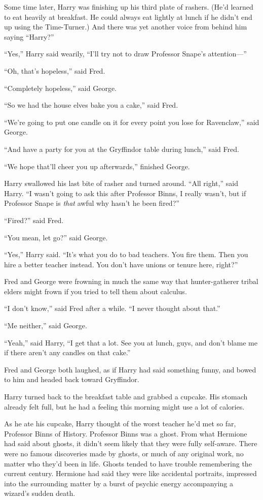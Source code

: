 Some time later, Harry was finishing up his third plate of rashers. (He’d learned to eat heavily at breakfast. He could always eat lightly at lunch if he didn’t end up using the Time-Turner.) And there was yet another voice from behind him saying “Harry?”

“Yes,” Harry said wearily, “I’ll try not to draw Professor Snape’s attention—”

“Oh, that’s hopeless,” said Fred.

“Completely hopeless,” said George.

“So we had the house elves bake you a cake,” said Fred.

“We’re going to put one candle on it for every point you lose for Ravenclaw,” said George.

“And have a party for you at the Gryffindor table during lunch,” said Fred.

“We hope that’ll cheer you up afterwards,” finished George.

Harry swallowed his last bite of rasher and turned around. “All right,” said Harry. “I wasn’t going to ask this after Professor Binns, I really wasn’t, but if Professor Snape is \emph{that} awful why hasn’t he been fired?”

“Fired?” said Fred.

“You mean, let go?” said George.

“Yes,” Harry said. “It’s what you do to bad teachers. You fire them. Then you hire a better teacher instead. You don’t have unions or tenure here, right?”

Fred and George were frowning in much the same way that hunter-gatherer tribal elders might frown if you tried to tell them about calculus.

“I don’t know,” said Fred after a while. “I never thought about that.”

“Me neither,” said George.

“Yeah,” said Harry, “I get that a lot. See you at lunch, guys, and don’t blame me if there aren’t any candles on that cake.”

Fred and George both laughed, as if Harry had said something funny, and bowed to him and headed back toward Gryffindor.

Harry turned back to the breakfast table and grabbed a cupcake. His stomach already felt full, but he had a feeling this morning might use a lot of calories.

As he ate his cupcake, Harry thought of the worst teacher he’d met so far, Professor Binns of History. Professor Binns was a ghost. From what Hermione had said about ghosts, it didn’t seem likely that they were fully self-aware. There were no famous discoveries made by ghosts, or much of any original work, no matter who they’d been in life. Ghosts tended to have trouble remembering the current century. Hermione had said they were like accidental portraits, impressed into the surrounding matter by a burst of psychic energy accompanying a wizard’s sudden death.

